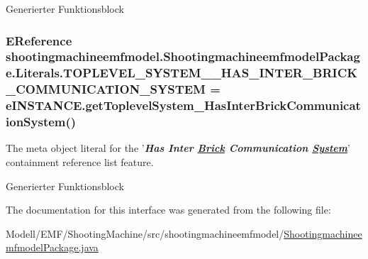 Generierter Funktionsblock \hypertarget{interfaceshootingmachineemfmodel_1_1_shootingmachineemfmodel_package_1_1_literals_a84278af2736b8a20be3c3f573a19a6dc}{
\subsubsection[{T\-O\-P\-L\-E\-V\-E\-L\-\_\-\-S\-Y\-S\-T\-E\-M\-\_\-\-\_\-\-H\-A\-S\-\_\-\-I\-N\-T\-E\-R\-\_\-\-B\-R\-I\-C\-K\-\_\-\-C\-O\-M\-M\-U\-N\-I\-C\-A\-T\-I\-O\-N\-\_\-\-S\-Y\-S\-T\-E\-M}]{\setlength{\rightskip}{0pt plus 5cm}E\-Reference shootingmachineemfmodel.\-Shootingmachineemfmodel\-Package.\-Literals.\-T\-O\-P\-L\-E\-V\-E\-L\-\_\-\-S\-Y\-S\-T\-E\-M\-\_\-\-\_\-\-H\-A\-S\-\_\-\-I\-N\-T\-E\-R\-\_\-\-B\-R\-I\-C\-K\-\_\-\-C\-O\-M\-M\-U\-N\-I\-C\-A\-T\-I\-O\-N\-\_\-\-S\-Y\-S\-T\-E\-M = e\-I\-N\-S\-T\-A\-N\-C\-E.\-get\-Toplevel\-System\-\_\-\-Has\-Inter\-Brick\-Communication\-System()}}\label{interfaceshootingmachineemfmodel_1_1_shootingmachineemfmodel_package_1_1_literals_a84278af2736b8a20be3c3f573a19a6dc}
The meta object literal for the '{\itshape {\bfseries Has Inter \hyperlink{interfaceshootingmachineemfmodel_1_1_brick}{Brick} Communication \hyperlink{interfaceshootingmachineemfmodel_1_1_system}{System}}}' containment reference list feature.

Generierter Funktionsblock 

The documentation for this interface was generated from the following file\-:\begin{DoxyCompactItemize}
\item 
Modell/\-E\-M\-F/\-Shooting\-Machine/src/shootingmachineemfmodel/\hyperlink{_shootingmachineemfmodel_package_8java}{Shootingmachineemfmodel\-Package.\-java}\end{DoxyCompactItemize}
